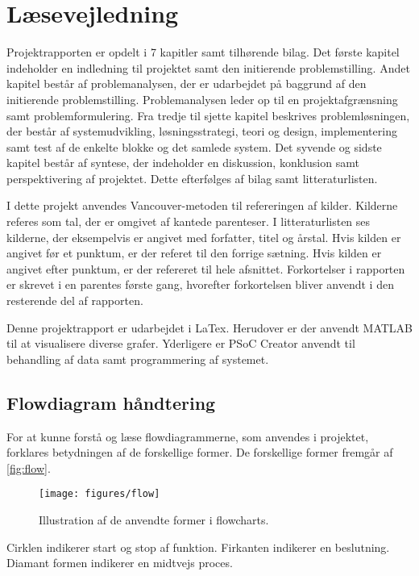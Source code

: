 \section*{Læsevejledning}
Projektrapporten er opdelt i 7 kapitler samt tilhørende bilag. Det første kapitel indeholder en indledning til projektet samt den initierende problemstilling. Andet kapitel består af problemanalysen, der er udarbejdet på baggrund af den initierende problemstilling. Problemanalysen leder op til en projektafgrænsning samt problemformulering. Fra tredje til sjette kapitel beskrives problemløsningen, der består af systemudvikling, løsningsstrategi, teori og design, implementering samt test af de enkelte blokke og det samlede system. Det syvende og sidste kapitel består af syntese, der indeholder en diskussion, konklusion samt perspektivering af projektet. Dette efterfølges af bilag samt litteraturlisten. 

I dette projekt anvendes Vancouver-metoden til refereringen af kilder. Kilderne referes som tal, der er omgivet af kantede parenteser. I litteraturlisten ses kilderne, der eksempelvis er angivet med forfatter, titel og årstal. Hvis kilden er angivet før et punktum, er der referet til den forrige sætning. Hvis kilden er angivet efter punktum, er der refereret til hele afsnittet. Forkortelser i rapporten er skrevet i en parentes første gang, hvorefter forkortelsen bliver anvendt i den resterende del af rapporten.
 
Denne projektrapport er udarbejdet i LaTex. Herudover er der anvendt MATLAB  til at visualisere diverse grafer. Yderligere er PSoC Creator anvendt til behandling af data samt programmering af systemet.  


\subsection*{Flowdiagram håndtering} \label{sec:flowhaandtering}
For at kunne forstå og læse flowdiagrammerne, som anvendes i projektet, forklares betydningen af de forskellige former. De forskellige former fremgår af \autoref{fig:flow}.

\begin{figure}[H]
\centering
\texttt{[image: figures/flow]}
\caption{Illustration af de anvendte former i flowcharts.}
\label{fig:flow}
\end{figure}

\noindent
Cirklen indikerer start og stop af funktion. Firkanten indikerer en beslutning. Diamant formen indikerer en midtvejs proces.